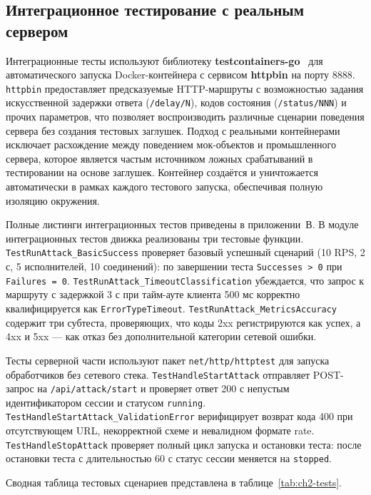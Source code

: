 \subsection*{Интеграционное тестирование с реальным сервером}

Интеграционные тесты используют библиотеку \textbf{testcontainers-go}~\cite{testcontainers} для автоматического запуска Docker-контейнера с сервисом \textbf{httpbin} на порту 8888.
\texttt{httpbin} предоставляет предсказуемые HTTP-маршруты с возможностью задания искусственной задержки ответа (\texttt{/delay/N}), кодов состояния (\texttt{/status/NNN}) и прочих параметров, что позволяет воспроизводить различные сценарии поведения сервера без создания тестовых заглушек.
Подход с реальными контейнерами исключает расхождение между поведением мок-объектов и промышленного сервера, которое является частым источником ложных срабатываний в тестировании на основе заглушек.
Контейнер создаётся и уничтожается автоматически в рамках каждого тестового запуска, обеспечивая полную изоляцию окружения.

Полные листинги интеграционных тестов приведены в приложении~В.
В модуле интеграционных тестов движка реализованы три тестовые функции.
\texttt{TestRunAttack\_BasicSuccess} проверяет базовый успешный сценарий (10 RPS, 2 с, 5 исполнителей, 10 соединений): по завершении теста \texttt{Successes > 0} при \texttt{Failures = 0}.
\texttt{TestRunAttack\_TimeoutClassification} убеждается, что запрос к маршруту с задержкой 3 с при тайм-ауте клиента 500 мс корректно квалифицируется как \texttt{ErrorTypeTimeout}.
\texttt{TestRunAttack\_MetricsAccuracy} содержит три субтеста, проверяющих, что коды 2xx регистрируются как успех, а 4xx и 5xx --- как отказ без дополнительной категории сетевой ошибки.

Тесты серверной части используют пакет \texttt{net/http/httptest} для запуска обработчиков без сетевого стека.
\texttt{TestHandleStartAttack} отправляет POST-запрос на \texttt{/api/attack/start} и проверяет ответ 200 с непустым идентификатором сессии и статусом \texttt{running}.
\texttt{TestHandleStartAttack\_ValidationError} верифицирует возврат кода 400 при отсутствующем URL, некорректной схеме и невалидном формате rate.
\texttt{TestHandleStopAttack} проверяет полный цикл запуска и остановки теста: после остановки теста с длительностью 60 с статус сессии меняется на \texttt{stopped}.

Сводная таблица тестовых сценариев представлена в таблице~\ref{tab:ch2-tests}.

